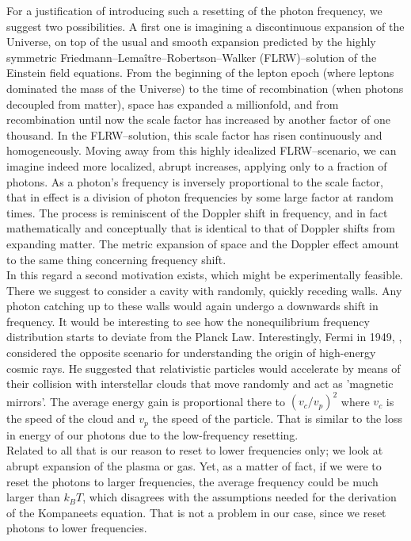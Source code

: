 \documentclass[a4paper,12pt,reqno,superscriptaddress,nofootinbib]{revtex4}
\theoremstyle{plain}
\theoremstyle{definition}
\theoremstyle{remark}
\newcommand{\0}{^{(0)}}
\newcommand{\1}{^{(1)}}
\newcommand{\2}{^{(2)}}
\begin{document}
For a justification of introducing such a resetting of the photon frequency, we suggest two possibilities.  A first one is imagining a discontinuous expansion of the Universe, on top of the usual and smooth expansion predicted by the highly symmetric Friedmann–Lemaître–Robertson–Walker (FLRW)--solution of the Einstein field equations.  From the beginning of the lepton epoch (where leptons dominated the mass of the Universe) to the time of recombination (when photons decoupled from matter), space has 
expanded a millionfold, and from recombination until now the scale factor has 
increased by another factor of one thousand. In the FLRW--solution, this scale factor has risen 
continuously and homogeneously. Moving away from this highly idealized FLRW--scenario, we can imagine indeed more localized, abrupt increases, applying only to a 
fraction of photons.  As a photon's frequency is inversely proportional to the 
scale factor, that in effect is a division of photon 
frequencies by some large factor at random times.  The process is reminiscent of the Doppler shift in 
frequency, and in fact mathematically and conceptually that is identical to that of Doppler shifts from expanding matter.  The metric expansion of space and the Doppler 
effect amount to the same thing concerning frequency shift. \\
 In this 
regard a second motivation exists, which might be experimentally feasible.  There we suggest to consider a cavity with randomly, quickly receding walls.  Any photon catching up to these walls would again undergo a downwards shift in  frequency.  It would be interesting to see how the nonequilibrium frequency distribution  starts to deviate from the Planck Law.  Interestingly, Fermi in 1949, \cite{fermi}, considered the opposite scenario for understanding the origin of high-energy cosmic rays.  He suggested that relativistic particles would accelerate by means
of their collision with interstellar clouds that move randomly and act as ’magnetic mirrors’.  The average energy gain is proportional there to $(v_c/v_p)^2$ where $v_c$ is the speed of the cloud and $v_p$ the speed of the particle.  That is similar to the loss in energy of our photons due to the low-frequency resetting.\\
Related to all that is our reason to reset to lower frequencies only; we look at abrupt expansion of the plasma or gas.  Yet, as a matter of fact, if we were to reset the photons to larger frequencies, the average frequency could be much larger than $k_BT$, which disagrees with the assumptions needed for the derivation of the Kompaneets equation. That is not a problem in our case, since we reset photons to lower frequencies.
\end{document}
